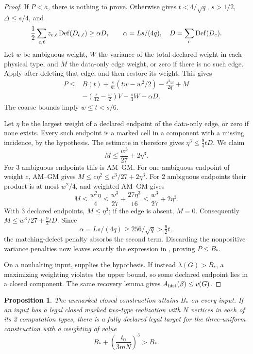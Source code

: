 \documentclass[10pt]{article}
\numberwithin{equation}{section}
\newtheorem{proposition}[proposition]{Proposition}\aliascntresetthe{proposition}
\theoremstyle{definition}
\begin{document}
\begin{proof}
If $P<a$, there is nothing to prove. Otherwise
 gives $t<4/\sqrt q$, $s>1/2$,
$\Delta\le s/4$, and
\[
 \frac12\sum_{e,\ell}z_{e,\ell}\operatorname{Def}(D_{e,\ell})\ge\alpha D,
 \qquad \alpha=Ls/(4q),\quad D=\sum_e\operatorname{Def}(D_e).
\]
Let $w$ be ambiguous weight, $W$ the variance of the total declared weight in each physical type, and $M$ the data-only edge weight, or zero if there is no such edge. Apply  after deleting that edge, and then restore its weight. This gives
\begin{align*}
 P\le{}&B(t)+\frac{s}{m}(tw-w^2/2)-\frac{s^2w}{2q}+M\\
 &-\left(\frac{s}{12}-\frac w2\right)V
 -\frac{s}{4}W-\alpha D.
\end{align*}
The coarse bounds imply $w\le t<s/6$.

Let $\eta$ be the largest weight of a declared endpoint of the data-only edge, or zero if none exists. Every such endpoint is a marked cell in a component with a missing incidence, by the hypothesis. The estimate in  therefore gives $\eta^3\le\tfrac94tD$. We claim
\[
 M\le\frac{w^3}{27}+2\eta^3.
\]
For 3 ambiguous endpoints this is AM--GM. For one ambiguous endpoint of weight $c$, AM--GM gives $M\le c\eta^2\le c^3/27+2\eta^3$. For 2 ambiguous endpoints their product is at most $w^2/4$, and weighted AM--GM gives
\[
 M\le\frac{w^2\eta}{4}
 \le\frac{w^3}{27}+\frac{27\eta^3}{16}
 \le\frac{w^3}{27}+2\eta^3.
\]
With 3 declared endpoints, $M\le\eta^3$; if the edge is absent, $M=0$. Consequently $M\le w^3/27+\tfrac92tD$. Since
\[
 \alpha=Ls/(4q)\ge256/\sqrt q>\tfrac92t,
\]
the matching-defect penalty absorbs the second term. Discarding the nonpositive variance penalties now leaves exactly the expression in
, proving $P\le B_*$.

On a nonhalting input,  supplies the hypothesis. If instead $\lambda(G)>B_*$, a maximizing weighting violates the upper bound, so some declared endpoint lies in a closed component. The same recovery lemma gives $A_{\rm hist}(\beta)\le v(G)$.
\end{proof}
\begin{proposition}
\label{prop:ternary-marker-lower-witnesses}
The unmarked closed construction attains $B_*$ on every input. If an input has a legal closed marked two-type realization with $N$ vertices in each of its 2 computation types, there is a fully declared legal target for the three-uniform construction with a weighting of value
\[
 B_*+\left(\frac{t_0}{3mN}\right)^3>B_*.
\]
\end{proposition}
\end{document}
